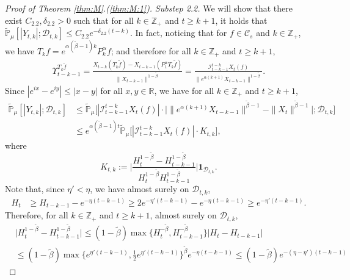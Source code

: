 \documentclass[EJP]{ejpecp} %
\begin{document}
\begin{proof}[Proof of Theorem \ref{thm:M}.(\ref{thm:M:1})]
  \emph{Substep 2.2.} We will show that there exist $C_{2.2},\delta_{2.2} > 0$ such that for all $k\in \mathbb Z_+$ and $t\geq k+1$, it holds that $ \mathbb{\widetilde{P}}_{\mu} [|Y_{t,k}|;\mathcal{D}_{t,k}] \leq  C_{2.2} e^{-\delta_{2.2} (t-k)}$.
  In fact, noticing that for $f\in \mathcal C_s$ and $k\in \mathbb Z_+$, we have $T_kf = e^{\alpha (\tilde \beta - 1 )k}P_k^\alpha f $; and therefore for all $k\in \mathbb Z_+$ and $t \geq k + 1$,
  \begin{align}
    \label{eq:gammafunction11}
    \Upsilon_{t-k-1}^{T_{k} \tilde f}
    = \frac{X_{t-k}(T_{k} \tilde  f) - X_{t -k-1}(P_1^\alpha T_{k} \tilde f)}{\|X_{t-k-1}\|^{1-\tilde \beta}}
    = \frac{\mathcal I_{t - k - 1}^{t - k} X_t(f)}{\|e^{\alpha (k+1)}X_{t-k-1} \|^{1 -\tilde \beta}}.
  \end{align}
  Since $|e^{ix}-e^{iy}|\leq|x-y|$ for all $x,y\in \mathbb R$, we have for all $k \in \mathbb Z_+$ and $t\geq k+1$,
  \begin{align}
    \label{eq: control of Ykt}
    \mathbb{\widetilde{P}}_{\mu}[|Y_{t,k}|;\mathcal{D}_{t,k}]
    & \leq \mathbb{\widetilde{P}}_{\mu}\Big[|\mathcal I_{t-k-1}^{t-k} X_t(f) | \cdot \Big| \| e^{\alpha(k+1)}X_{t-k-1}\| ^{ \tilde \beta - 1} - \|X_t\|^{ \tilde \beta - 1}\Big|; \mathcal D_{t,k}\Big] \\
    & \leq  e^{\alpha(\tilde \beta - 1)t}\mathbb{\widetilde{P}}_{\mu}\big[|\mathcal I_{t-k-1}^{t-k}X_t(f)|\cdot K_{t,k}\big],
  \end{align}
  where
  \[
    K_{t,k}
    := \Big| \frac {H_t^{1- \tilde \beta} - H_{t-k-1}^{1 - \tilde \beta}} {H_t^{1 - \tilde \beta} H_{t-k-1}^{ 1- \tilde \beta }} \Big| \mathbf{1}_{\mathcal{D}_{t,k}}.
  \]
  Note that, since $\eta' < \eta$, we have almost surely on $\mathcal D_{t,k}$,
  \begin{align}
    H_t
    & \geq H_{t-k-1}- e^{-\eta (t-k-1)}
      \geq 2e^{-\eta'(t-k-1)}-e^{-\eta(t-k-1)}
      \geq e^{-\eta'(t-k-1)}.
  \end{align}
  Therefore, for all $k \in \mathbb Z_+$ and $t\geq k+1$, almost surely  on $\mathcal D_{t,k}$,
  \begin{align}
    & \Big|H_t^{1- \tilde \beta}-H_{t-k-1}^{1- \tilde \beta}\Big|
      \leq (1- \tilde \beta) \max \{ H_t^{-\tilde \beta }, H_{t-k-1}^{ -\tilde \beta} \} | H_t - H_{t-k-1} | \\
    & \leq (1- \tilde \beta ) \max\{e^{\eta' (t-k-1)}, \frac{1}{2}e^{\eta'(t-k-1)}\}^{\tilde \beta} e^{-\eta(t-k-1)}  \leq (1- \tilde \beta) e^{-(\eta - \eta') (t-k-1)}
  \end{align}

\end{proof}
\end{document}
